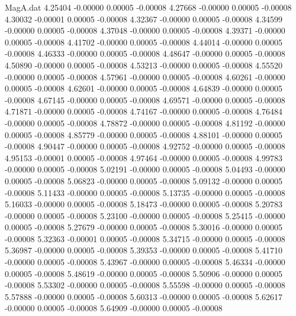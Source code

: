 \begin{filecontents}{MagA.dat}
   4.25404   -0.00000    0.00005   -0.00008
   4.27668   -0.00000    0.00005   -0.00008
   4.30032   -0.00001    0.00005   -0.00008
   4.32367   -0.00000    0.00005   -0.00008
   4.34599   -0.00000    0.00005   -0.00008
   4.37048   -0.00000    0.00005   -0.00008
   4.39371   -0.00000    0.00005   -0.00008
   4.41702   -0.00000    0.00005   -0.00008
   4.44014   -0.00000    0.00005   -0.00008
   4.46333   -0.00000    0.00005   -0.00008
   4.48647   -0.00000    0.00005   -0.00008
   4.50890   -0.00000    0.00005   -0.00008
   4.53213   -0.00000    0.00005   -0.00008
   4.55520   -0.00000    0.00005   -0.00008
   4.57961   -0.00000    0.00005   -0.00008
   4.60261   -0.00000    0.00005   -0.00008
   4.62601   -0.00000    0.00005   -0.00008
   4.64839   -0.00000    0.00005   -0.00008
   4.67145   -0.00000    0.00005   -0.00008
   4.69571   -0.00000    0.00005   -0.00008
   4.71871   -0.00000    0.00005   -0.00008
   4.74167   -0.00000    0.00005   -0.00008
   4.76484   -0.00000    0.00005   -0.00008
   4.78872   -0.00000    0.00005   -0.00008
   4.81192   -0.00000    0.00005   -0.00008
   4.85779   -0.00000    0.00005   -0.00008
   4.88101   -0.00000    0.00005   -0.00008
   4.90447   -0.00000    0.00005   -0.00008
   4.92752   -0.00000    0.00005   -0.00008
   4.95153   -0.00001    0.00005   -0.00008
   4.97464   -0.00000    0.00005   -0.00008
   4.99783   -0.00000    0.00005   -0.00008
   5.02191   -0.00000    0.00005   -0.00008
   5.04493   -0.00000    0.00005   -0.00008
   5.06823   -0.00000    0.00005   -0.00008
   5.09132   -0.00000    0.00005   -0.00008
   5.11433   -0.00000    0.00005   -0.00008
   5.13735   -0.00000    0.00005   -0.00008
   5.16033   -0.00000    0.00005   -0.00008
   5.18473   -0.00000    0.00005   -0.00008
   5.20783   -0.00000    0.00005   -0.00008
   5.23100   -0.00000    0.00005   -0.00008
   5.25415   -0.00000    0.00005   -0.00008
   5.27679   -0.00000    0.00005   -0.00008
   5.30016   -0.00000    0.00005   -0.00008
   5.32363   -0.00001    0.00005   -0.00008
   5.34715   -0.00000    0.00005   -0.00008
   5.36987   -0.00000    0.00005   -0.00008
   5.39353   -0.00000    0.00005   -0.00008
   5.41710   -0.00000    0.00005   -0.00008
   5.43967   -0.00000    0.00005   -0.00008
   5.46334   -0.00000    0.00005   -0.00008
   5.48619   -0.00000    0.00005   -0.00008
   5.50906   -0.00000    0.00005   -0.00008
   5.53302   -0.00000    0.00005   -0.00008
   5.55598   -0.00000    0.00005   -0.00008
   5.57888   -0.00000    0.00005   -0.00008
   5.60313   -0.00000    0.00005   -0.00008
   5.62617   -0.00000    0.00005   -0.00008
   5.64909   -0.00000    0.00005   -0.00008

\end{filecontents}
